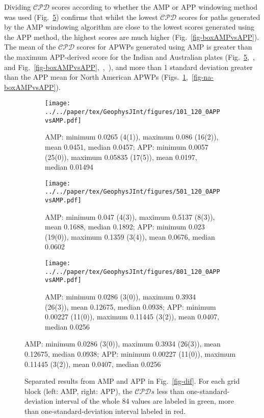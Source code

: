 Dividing $\mathcal{CPD}$ scores according to whether the AMP or APP windowing
method was used (Fig.~\ref{fig-difAMPvsAPP}) confirms that whilst the lowest
$\mathcal{CPD}$ scores for paths generated by the AMP windowing algorithm are
close to the lowest scores generated using the APP method, the highest scores
are much higher (Fig.~\ref{fig-boxAMPvsAPP}). The mean of the $\mathcal{CPD}$
scores for APWPs generated using AMP is greater than the maximum APP-derived
score for the Indian and Australian plates
(Fig.~\ref{fig-difAMPvsAPP},~,~
and Fig.~\ref{fig-boxAMPvsAPP},~,~),
and more than 1 standard deviation greater than the APP mean for North American
APWPs (Figs.~\ref{fig-na-difAMPvsAPP},~\ref{fig-na-boxAMPvsAPP}).

\begin{figure}[tbp]
  \centering
  \begin{subfigure}{1.01\textwidth}
    \texttt{[image: ../../paper/tex/GeophysJInt/figures/101\_120\_0APPvsAMP.pdf]}
    \caption{AMP\@: minimum 0.0265 (4(1)), maximum 0.086 (16(2)), mean 0.0451,
      median 0.0457; APP\@: minimum 0.0057 (25(0)), maximum 0.05835 (17(5)),
      mean 0.0197, median 0.01494}\label{fig-na-difAMPvsAPP}
  \end{subfigure}
  \vspace{.1em}
  \begin{subfigure}{1.01\textwidth}
    \texttt{[image: ../../paper/tex/GeophysJInt/figures/501\_120\_0APPvsAMP.pdf]}
    \caption{AMP\@: minimum 0.047 (4(3)), maximum 0.5137 (8(3)), mean 0.1688,
      median 0.1892; APP\@: minimum 0.023 (19(0)), maximum 0.1359 (3(4)), mean
      0.0676, median 0.0602}\label{fig-in-difAMPvsAPP}
  \end{subfigure}
  \vspace{.1em}
  \begin{subfigure}{1.01\textwidth}
    \texttt{[image: ../../paper/tex/GeophysJInt/figures/801\_120\_0APPvsAMP.pdf]}
    \caption{AMP\@: minimum 0.0286 (3(0)), maximum 0.3934 (26(3)), mean 0.12675,
      median 0.0938; APP\@: minimum 0.00227 (11(0)), maximum 0.11445 (3(2)),
      mean 0.0407, median 0.0256}\label{fig-au-difAMPvsAPP}
  \end{subfigure}
\end{figure}
\begin{figure}[!ht]
  \ContinuedFloat\caption[$\mathcal{CPD}$ of each plate's paleomagnetic APWPs vs its FHM
    predicted APWP (AMP vs APP)]{Separated results from AMP and APP in
    Fig.~\ref{fig-dif}. For each grid block (left: AMP, right: APP), the
    $\mathcal{CPD}s$ less than one-standard-deviation interval of the whole 84
    values are labeled in green, more than one-standard-deviation interval
    labeled in red.}\label{fig-difAMPvsAPP}
\end{figure}

